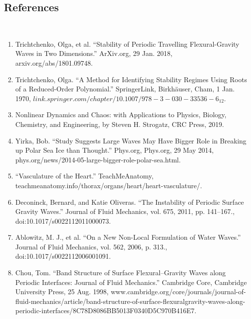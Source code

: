 \documentclass{article}
\begin{document}
\clearpage

\subsection{References}
\\
\begin{enumerate}

\item Trichtchenko, Olga, et al. “Stability of Periodic Travelling Flexural-Gravity Waves in Two Dimensions.” ArXiv.org, 29 Jan. 2018, arxiv.org/abs/1801.09748. \label{olga1} \\

\item Trichtchenko, Olga. “A Method for Identifying Stability Regimes Using Roots of a Reduced-Order Polynomial.” SpringerLink, Birkhäuser, Cham, 1 Jan. 1970, \(link.springer.com/chapter/10.1007/978-3-030-33536-6_12\).\label{reduced}\\

\item Nonlinear Dynamics and Chaos: with Applications to Physics, Biology, Chemistry, and Engineering, by Steven H. Strogatz, CRC Press, 2019.  \label{stabilitypde}

\item Yirka, Bob. “Study Suggests Large Waves May Have Bigger Role in Breaking up Polar Sea Ice than Thought.” Phys.org, Phys.org, 29 May 2014, phys.org/news/2014-05-large-bigger-role-polar-sea.html. \label{icewavespic}

\item “Vasculature of the Heart.” TeachMeAnatomy, teachmeanatomy.info/thorax/organs/heart/heart-vasculature/.  \label{heart}

\item Deconinck, Bernard, and Katie Oliveras. “The Instability of Periodic Surface Gravity Waves.” Journal of Fluid Mechanics, vol. 675, 2011, pp. 141–167., doi:10.1017/s0022112011000073. \label{katie}

\item Ablowitz, M. J., et al. “On a New Non-Local Formulation of Water Waves.” Journal of Fluid Mechanics, vol. 562, 2006, p. 313., doi:10.1017/s0022112006001091. \label{AFM}

\item \label{bandstructure} Chou, Tom. “Band Structure of Surface Flexural–Gravity Waves along Periodic Interfaces: Journal of Fluid Mechanics.” Cambridge Core, Cambridge University Press, 25 Aug. 1998, www.cambridge.org/core/journals/journal-of-fluid-mechanics/article/band-structure-of-surface-flexuralgravity-waves-along-periodic-interfaces/8C78D8086BB5013F0340D5C970B416E7. \\


\end{enumerate}
\end{document}
